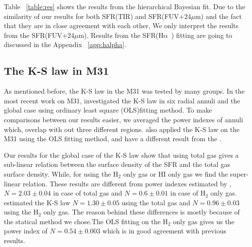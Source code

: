 \documentclass[useAMS,usenatbib]{mn2e}
\newcommand \halpha    {H$\alpha $\ }
\begin{document}


Table ~\ref{table:res} shows the results from the hierarchical Bayesian fit. Due to the similarity of our results for both SFR(TIR) and SFR(FUV+24$\mu$m) and the fact that they are in close agreement with each other, We only interpret the results from the SFR(FUV+24$\mu$m). Results from the SFR(\halpha) fitting are going to discussed in the Appendix ~\ref{app:halpha}. %

\subsection{The K-S law in M31}

As mentioned before, the K-S law in the M31 was tested by many groups. In the most recent work on M31, \cite{Ford13} investigated the K-S law in six radial annuli and the global case using ordinary least square (OLS)fitting method. To make comparisons between our results easier, we averaged the power indexes of annuli which, overlap with out three different regions. \cite{Tabatabaei10} also applied the K-S law on the M31 using the OLS fitting method, and have a different result from the \cite{Ford13}.

Our results for the global case of the K-S law show that using total gas gives a sub-linear relation between the surface density of the SFR and the total gas surface density. While, for using the H$_{2}$ only gas or HI only gas we find the super-linear relation. These results are different from power indexes estimated by \cite{Ford13}, $N=2.03\pm0.04$ in case of total gas and $N=0.6\pm0.01$ in case of H$_{2}$ only gas. \cite{Tabatabaei10} estimated the K-S law $N=1.30\pm0.05$ using the total gas and $N=0.96\pm0.03$ using the H$_{2}$ only gas. The reason behind these differences is mostly because of the statical method we chose.The OLS fitting on the H$_{2}$ only gas gives us the power index of $N=0.54\pm0.003$ which is in good agreement with previous results.
\end{document}
